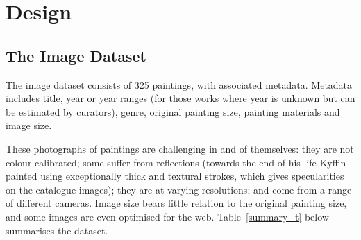 \chapter{Design}








\section{The Image Dataset}
The image dataset consists of 325 paintings, with associated metadata. Metadata
includes title, year or year ranges (for those works where year is unknown but
can be estimated by curators), genre, original painting size, painting
materials and image size.

These photographs of paintings are challenging in and of themselves: they are
not colour calibrated; some suffer from reflections (towards the end of his
life Kyffin painted using exceptionally thick and textural strokes, which gives
specularities on the catalogue images); they are at varying resolutions; and
come from a range of different cameras. Image size bears little relation to the
original painting size, and some images are even optimised for the web.
Table~\ref{summary_t} below summarises the dataset.

